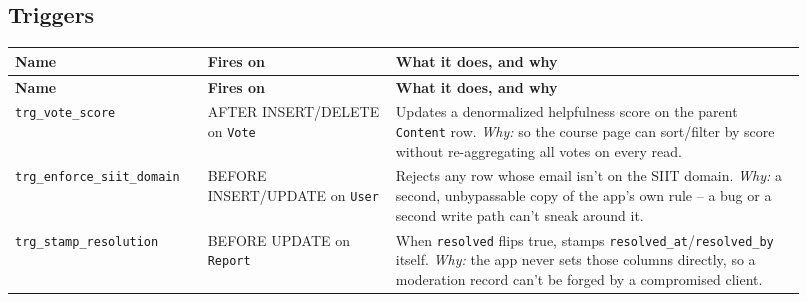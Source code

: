\documentclass[11pt]{article}
\begin{document}
\subsection{Triggers}
\begin{longtable}{@{}p{0.22\linewidth} p{0.22\linewidth} p{0.48\linewidth}@{}}
\toprule
\textbf{Name} & \textbf{Fires on} & \textbf{What it does, and why} \\
\midrule
\endfirsthead
\toprule
\textbf{Name} & \textbf{Fires on} & \textbf{What it does, and why} \\
\midrule
\endhead
\bottomrule
\endfoot
\texttt{trg\_vote\_score} & AFTER INSERT/DELETE on \texttt{Vote} & Updates a denormalized helpfulness score on the parent \texttt{Content} row. \emph{Why:} so the course page can sort/filter by score without re-aggregating all votes on every read. \\[4pt]
\texttt{trg\_enforce\_\allowbreak siit\_domain} & BEFORE INSERT/UPDATE on \texttt{User} & Rejects any row whose email isn't on the SIIT domain. \emph{Why:} a second, unbypassable copy of the app's own rule -- a bug or a second write path can't sneak around it. \\[4pt]
\texttt{trg\_stamp\_\allowbreak resolution} & BEFORE UPDATE on \texttt{Report} & When \texttt{resolved} flips true, stamps \texttt{resolved\_at}/\texttt{resolved\_by} itself. \emph{Why:} the app never sets those columns directly, so a moderation record can't be forged by a compromised client. \\
\end{longtable}
\end{document}
